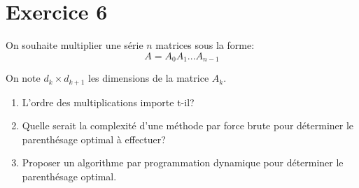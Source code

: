 \documentclass[a4paper,10pt]{article}
\begin{document}

\section*{Exercice 6}

On souhaite multiplier une série $n$ matrices sous la forme: $$A = A_0 A_1 ... A_{n-1}$$

On note $d_k \times d_{k+1}$ les dimensions de la matrice $A_k$.

\begin{enumerate}
\item L'ordre des multiplications importe t-il?
\item Quelle serait la complexité d'une méthode par force brute pour déterminer le parenthésage optimal à effectuer?
\item Proposer un algorithme par programmation dynamique pour déterminer le parenthésage optimal.
\end{enumerate}












\end{document}

